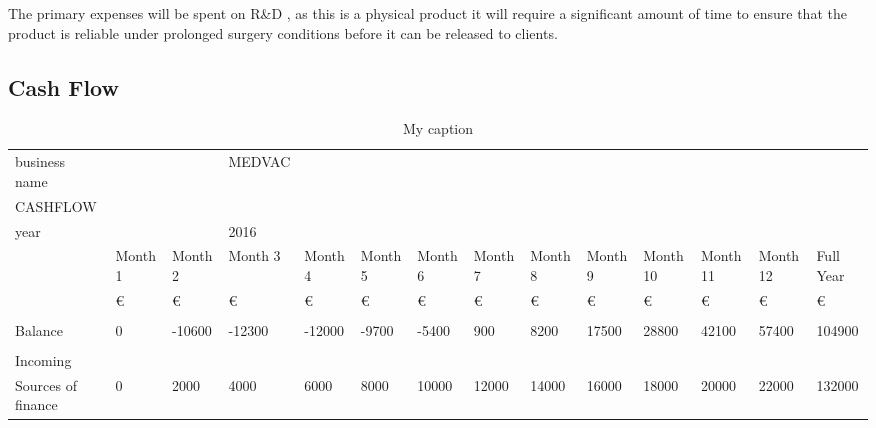 \documentclass{article}
\begin{document}
The primary expenses will be spent on R&D , as this is a physical product it will require a significant amount of time to ensure that the product is reliable under prolonged surgery conditions before it can be released to clients.

\pagebreak
\subsection{Cash Flow}
\begin{landscape}

\begin{table}[H]
\centering
\caption{My caption}
\label{my-label}
\begin{tabular}{llllllllllllll}
business name      &         &         & MEDVAC  &         &         &         &         &         &         &          &          &          &           \\
CASHFLOW           &         &         &         &         &         &         &         &         &         &          &          &          &           \\
year               &         &         & 2016    &         &         &         &         &         &         &          &          &          &           \\
                   & Month 1 & Month 2 & Month 3 & Month 4 & Month 5 & Month 6 & Month 7 & Month 8 & Month 9 & Month 10 & Month 11 & Month 12 & Full Year \\
                   & €       & €       & €       & €       & €       & €       & €       & €       & €       & €        & €        & €        & €         \\
                   &         &         &         &         &         &         &         &         &         &          &          &          &           \\
Balance            & 0       & -10600  & -12300  & -12000  & -9700   & -5400   & 900     & 8200    & 17500   & 28800    & 42100    & 57400    & 104900    \\
                   &         &         &         &         &         &         &         &         &         &          &          &          &           \\
Incoming           &         &         &         &         &         &         &         &         &         &          &          &          &           \\
Sources of finance & 0       & 2000    & 4000    & 6000    & 8000    & 10000   & 12000   & 14000   & 16000   & 18000    & 20000    & 22000    & 132000    \\

\end{tabular}
\end{table}
\end{landscape}
\end{document}
